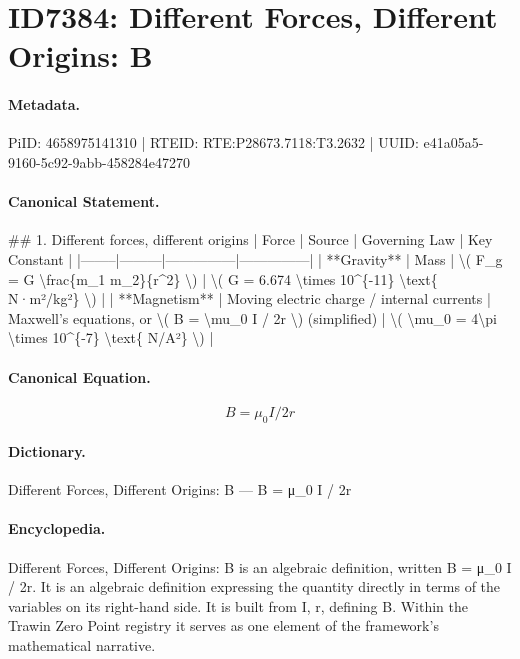 \section*{ID7384: Different Forces, Different Origins: B}
\paragraph{Metadata.}
PiID: 4658975141310 | RTEID: RTE:P28673.7118:T3.2632 | UUID: e41a05a5-9160-5c92-9abb-458284e47270

\paragraph{Canonical Statement.}
\#\# 1. Different forces, different origins | Force | Source | Governing Law | Key Constant | |--------|---------|---------------|---------------| | **Gravity** | Mass | \textbackslash{}( F\_g = G \textbackslash{}frac\{m\_1 m\_2\}\{r\textasciicircum{}2\} \textbackslash{}) | \textbackslash{}( G = 6.674 \textbackslash{}times 10\textasciicircum{}\{-11\} \textbackslash{}text\{ N·m²/kg²\} \textbackslash{}) | | **Magnetism** | Moving electric charge / internal currents | Maxwell’s equations, or \textbackslash{}( B = \textbackslash{}mu\_0 I / 2r \textbackslash{}) (simplified) | \textbackslash{}( \textbackslash{}mu\_0 = 4\textbackslash{}pi \textbackslash{}times 10\textasciicircum{}\{-7\} \textbackslash{}text\{ N/A²\} \textbackslash{}) |

\paragraph{Canonical Equation.}
\[
B = \mu_0 I / 2r
\]

\paragraph{Dictionary.}
Different Forces, Different Origins: B — B = μ\_0 I / 2r

\paragraph{Encyclopedia.}
Different Forces, Different Origins: B is an algebraic definition, written B = μ\_0 I / 2r. It is an algebraic definition expressing the quantity directly in terms of the variables on its right-hand side. It is built from I, r, defining B. Within the Trawin Zero Point registry it serves as one element of the framework's mathematical narrative.
